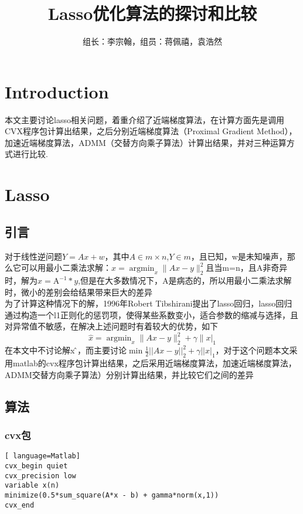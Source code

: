 \documentclass[cn,11pt,chinese,black]{elegantbook}
\title{Lasso优化算法的探讨和比较}
\author{组长：李宗翰，组员：蒋佩禧，袁浩然}
\begin{document}
	\maketitle
	\chapter*{Introduction}
 本文主要讨论lasso相关问题，着重介绍了近端梯度算法，在计算方面先是调用CVX程序包计算出结果，之后分别近端梯度算法（Proximal Gradient Method），加速近端梯度算法，ADMM（交替方向乘子算法）计算出结果，并对三种运算方式进行比较.
	\chapter{Lasso}
\section{引言}
 \noindent 对于线性逆问题$Y=Ax+w$，其中$A\in m×n$,$Y\in m$，且已知，w是未知噪声，那么它可以用最小二乘法求解：$\hat{x}=\operatorname{argmin}_{x}\|A x-y\|_{2}^{2}$且当m=n，且A非奇异时，解为$\hat{x}=\mathrm{A}^{-1} * y$,但是在大多数情况下，A是病态的，所以用最小二乘法求解时，微小的差别会给结果带来巨大的差异\\
为了计算这种情况下的解，1996年Robert Tibshirani提出了lasso回归，lasso回归通过构造一个l1正则化的惩罚项，使得某些系数变小，适合参数的缩减与选择，且对异常值不敏感，在解决上述问题时有着较大的优势，如下
$$\hat{x}=\operatorname{argmin}_{x}\|A x-y\|_{2}^{2}+\gamma \|\left. x\right|_{1}$$
在本文中不讨论解x ̂，而主要讨论$\min \frac{1}{2}|| A x-y||_{2}^{2}+\left.\gamma|| x\right|_{1}$，对于这个问题本文采用matlab的cvx程序包计算出结果，之后采用近端梯度算法，加速近端梯度算法，ADMM交替方向乘子算法）分别计算出结果，并比较它们之间的差异
\section{算法}
\subsection{cvx包}
\begin{lstlisting}[ language=Matlab] 
cvx_begin quiet
cvx_precision low
variable x(n)
minimize(0.5*sum_square(A*x - b) + gamma*norm(x,1))
cvx_end
\end{lstlisting}
\end{document}
